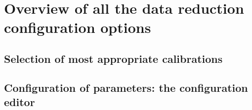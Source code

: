 \section{Overview of all the data reduction configuration options}
\label{sec:configuretion_overview}

\subsection{Selection of most appropriate calibrations}



\subsection{Configuration of parameters: the configuration editor}
\label{sec:configuration_editor}


